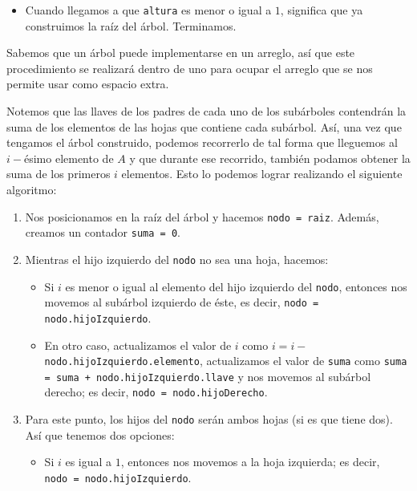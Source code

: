 \documentclass[letterpaper,11pt]{article}
\begin{document}
\begin{enumerate}
\begin{itemize}
\begin{itemize}
            \item Cuando llegamos a que \texttt{altura} es menor o igual a $1$, 
            significa que ya construimos la raíz del árbol. Terminamos.
        \end{itemize}

        Sabemos que un árbol puede implementarse en un arreglo, así que este 
        procedimiento se realizará dentro de uno para ocupar el arreglo que se 
        nos permite usar como espacio extra. 
        
        Notemos que las llaves de los padres de cada uno de los subárboles 
        contendrán la suma de los elementos de las hojas que contiene cada 
        subárbol. Así, una vez que tengamos el árbol construido, podemos 
        recorrerlo de tal forma que lleguemos al $i-$ésimo elemento de $A$
        y que durante ese recorrido, también podamos obtener la suma de los 
        primeros $i$ elementos. Esto lo podemos lograr realizando el siguiente 
        algoritmo:
        \begin{enumerate}
            \item Nos posicionamos en la raíz del árbol y hacemos 
            \texttt{nodo = raiz}. Además, creamos un contador \texttt{suma = 0}.

            \item Mientras el hijo izquierdo del \texttt{nodo} no sea una 
            hoja, hacemos:
            \begin{itemize}
                \item Si $i$ es menor o igual al elemento del hijo izquierdo 
                del \texttt{nodo}, entonces nos movemos al subárbol izquierdo 
                de éste, es decir, \texttt{nodo = nodo.hijoIzquierdo}.

                \item En otro caso, actualizamos el valor de $i$ como 
                $i = i -$ \texttt{nodo.hijoIzquierdo.elemento}, actualizamos 
                el valor de \texttt{suma} como 
                \texttt{suma = suma + nodo.hijoIzquierdo.llave} y nos movemos 
                al subárbol derecho; es decir, \texttt{nodo = nodo.hijoDerecho}.
            \end{itemize}

            \item Para este punto, los hijos del \texttt{nodo} serán ambos 
            hojas (si es que tiene dos). Así que tenemos dos opciones:
            \begin{itemize}
                \item Si $i$ es igual a $1$, entonces nos movemos a la 
                hoja izquierda; es decir, \\ 
                \texttt{nodo = nodo.hijoIzquierdo}.


\end{itemize}
\end{enumerate}
\end{itemize}
\end{enumerate}
\end{document}
